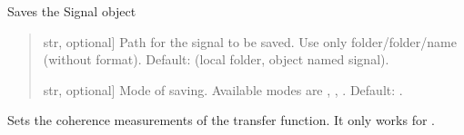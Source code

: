 \documentclass[letterpaper,10pt,english]{sphinxmanual}
\begin{document}
\begin{fulllineitems}
\begin{fulllineitems}
\label{\detokenize{classes:dsptools.classes.signal_class.Signal.save_signal}}
\pysigstartsignatures
{}
\pysigstopsignatures
\sphinxAtStartPar
Saves the Signal object
\begin{quote}\begin{description}
\begin{description}
\sphinxlineitem{\sphinxstylestrong{path}}{[}str, optional{]}
\sphinxAtStartPar
Path for the signal to be saved. Use only folder/folder/name
(without format). Default: 
(local folder, object named signal).

\sphinxlineitem{\sphinxstylestrong{mode}}{[}str, optional{]}
\sphinxAtStartPar
Mode of saving. Available modes are , , .
Default: .

\end{description}

\end{description}\end{quote}

\end{fulllineitems}


\begin{fulllineitems}
\label{\detokenize{classes:dsptools.classes.signal_class.Signal.set_coherence}}
\pysigstartsignatures
{}
\pysigstopsignatures
\sphinxAtStartPar
Sets the coherence measurements of the transfer function.
It only works for .


\end{fulllineitems}
\end{fulllineitems}
\end{document}
